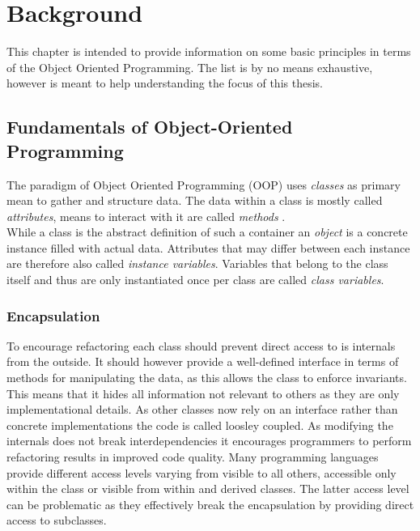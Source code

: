 \chapter{Background}

This chapter is intended to provide information on some basic principles in terms of the Object Oriented Programming. The list is by no means exhaustive, however is meant to help understanding the focus of this thesis.

\section{Fundamentals of Object-Oriented Programming}

The paradigm of Object Oriented Programming (OOP) uses \emph{classes} as primary mean to gather and structure data. The data within a class is mostly called \emph{attributes}, means to interact with it are called \emph{methods} \cite[80]{Castagna97}. \\
While a class is the abstract definition of such a container an \emph{object} is a concrete instance filled with actual data. Attributes that may differ between each instance are therefore also called \emph{instance variables}. Variables that belong to the class itself and thus are only instantiated once per class are called \emph{class variables}.

\subsection{Encapsulation} 
To encourage refactoring each class should prevent direct access to is internals from the outside. It should however provide a well-defined interface in terms of methods for manipulating the data, as this allows the class to enforce invariants. This means that it hides all information not relevant to others as they are only implementational details. As other classes now rely on an interface rather than concrete implementations the code is called loosley coupled. As modifying the internals does not break interdependencies it encourages programmers to perform refactoring results in improved code quality. Many programming languages provide different access levels varying from visible to all others, accessible only within the class or visible from within and derived classes. The latter access level can be problematic as they effectively break the encapsulation by providing direct access to subclasses. 


